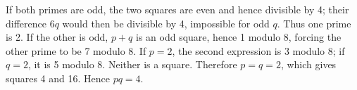 If both primes are odd, the two squares are even and hence divisible by 4; their difference $6q$ would then be divisible by 4, impossible for odd $q$. Thus one prime is 2. If the other is odd, $p+q$ is an odd square, hence 1 modulo 8, forcing the other prime to be 7 modulo 8. If $p=2$, the second expression is 3 modulo 8; if $q=2$, it is 5 modulo 8. Neither is a square. Therefore $p=q=2$, which gives squares 4 and 16. Hence $\boxed{pq=4}$.
